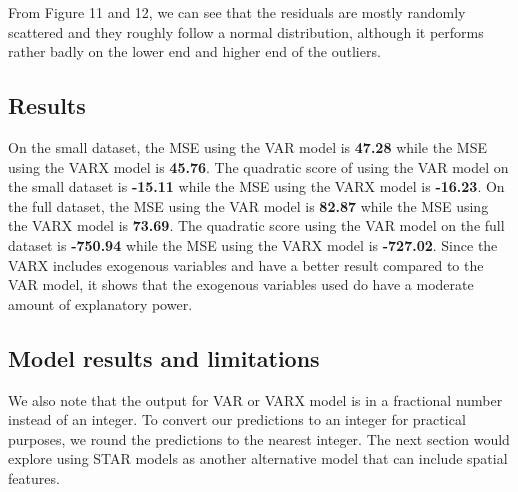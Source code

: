 \documentclass[nonblindrev,msom]{informs3} %
\begin{document}
\noindent From Figure 11 and 12, we can see that the residuals are mostly randomly scattered and they roughly follow a normal distribution, although it performs rather badly on the lower end and higher end of the outliers. 


%
%
%

\subsection{Results}
On the small dataset, the MSE using the VAR model is \textbf{47.28} while the MSE using the VARX model is \textbf{45.76}. The quadratic score of using the VAR model on the small dataset is \textbf{-15.11} while the MSE using the VARX model is \textbf{-16.23}. On the full dataset, the MSE using the VAR model is \textbf{82.87} while the MSE using the VARX model is \textbf{73.69}. The quadratic score using the VAR model on the full dataset is \textbf{-750.94} while the MSE using the VARX model is \textbf{-727.02}. Since the VARX includes exogenous variables and have a better result compared to the VAR model, it shows that the exogenous variables used do have a moderate amount of explanatory power. 

\subsection{Model results and limitations}

We also note that the output for VAR or VARX model is in a fractional number instead of an integer. To convert our predictions to an integer for practical purposes, we round the predictions to the nearest integer. The next section would explore using STAR models as another alternative model that can include spatial features. 
\end{document}

